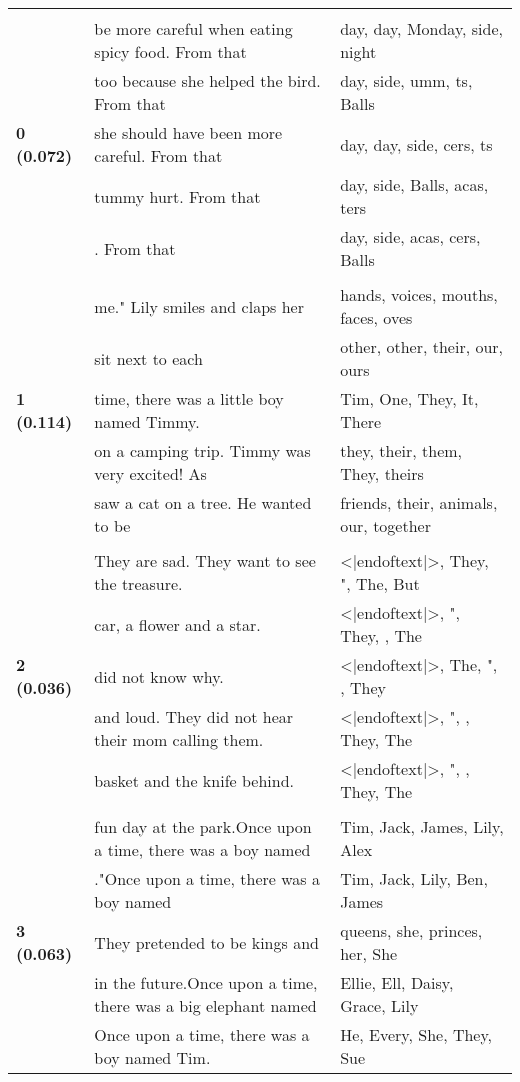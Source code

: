 \documentclass{article}
\begin{document}
\begin{longtable}{|p{}|p{}|p{}|}
\hline
\endlastfoot
& & \\
\multirow{5}{*}{\textbf{0 (0.072)}} & be more careful when eating spicy food. From that & day, day,  Monday, side, night \\
& too because she helped the bird. From that & day, side, umm, ts,  Balls \\
& she should have been more careful. From that & day, day, side, cers, ts \\
& tummy hurt. From that & day, side,  Balls, acas, ters \\
& . From that & day, side, acas, cers,  Balls \\
& & \\
\multirow{5}{*}{\textbf{1 (0.114)}} & me."  Lily smiles and claps her & hands,  voices,  mouths,  faces, oves \\
& sit next to each & other, other,  their,  our,  ours \\
& time, there was a little boy named Timmy. & Tim,  One,  They,  It,  There \\
& on a camping trip. Timmy was very excited!   As & they,  their,  them, They,  theirs \\
& saw a cat on a tree. He wanted to be & friends,  their,  animals,  our,  together \\
& & \\
\multirow{5}{*}{\textbf{2 (0.036)}} & They are sad. They want to see the treasure. & <|endoftext|>, They, ", The, But \\
& car, a flower and a star. & <|endoftext|>, ", They,  , The \\
& did not know why. & <|endoftext|>, The, ",  , They \\
& and loud. They did not hear their mom calling them. & <|endoftext|>, ",  , They, The \\
& basket and the knife behind. & <|endoftext|>, ",  , They, The \\
& & \\
\multirow{5}{*}{\textbf{3 (0.063)}} & fun day at the park.Once upon a time, there was a boy named & Tim,  Jack,  James,  Lily,  Alex \\
& ."Once upon a time, there was a boy named & Tim,  Jack,  Lily,  Ben,  James \\
& They pretended to be kings and & queens,  she,  princes,  her,  She \\
& in the future.Once upon a time, there was a big elephant named & Ellie,  Ell,  Daisy,  Grace,  Lily \\
& Once upon a time, there was a boy named Tim. & He,  Every,  She,  They,  Sue \\

\end{longtable}
\end{document}
